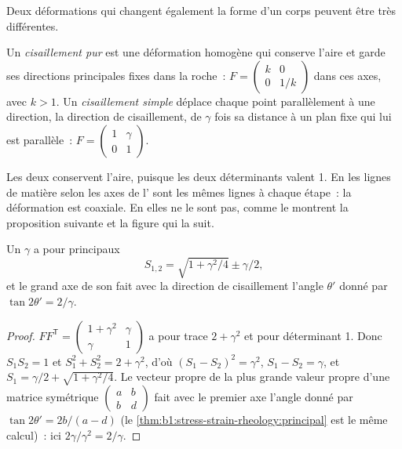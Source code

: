 Deux déformations qui changent également la forme d'un corps peuvent être très différentes.

\begin{definition}\label{def:b1:stress-strain-rheology:shear-types}
Un \emph{cisaillement pur} est une déformation homogène qui conserve
l'aire et garde ses directions principales fixes dans la roche~:
$F = \begin{pmatrix} k & 0 \\ 0 & 1/k\end{pmatrix}$ dans ces axes, avec
$k > 1$. Un \emph{cisaillement simple} déplace chaque point parallèlement à
une direction, la direction de cisaillement, de $\gamma$ fois sa distance à un
plan fixe qui lui est parallèle~:
$F = \begin{pmatrix} 1 & \gamma \\ 0 & 1\end{pmatrix}$.
\end{definition}

Les deux conservent l'aire, puisque les deux déterminants valent 1. En  les lignes de
matière selon les axes de l' sont les mêmes lignes à chaque
étape~: la déformation est coaxiale. En  elles ne le sont pas, comme le montrent la
proposition suivante et la figure qui la suit.

\begin{proposition}\label{prop:b1:stress-strain-rheology:simple-shear}
Un  $\gamma$ a pour  principaux
\[
  S_{1,2} = \sqrt{1 + \gamma^2/4} \pm \gamma/2 ,
\]
et le grand axe de son  fait avec la direction de cisaillement
l'angle $\theta'$ donné par $\tan2\theta' = 2/\gamma$.
\end{proposition}

\begin{proof}
$FF^{\mathsf T} = \begin{pmatrix} 1+\gamma^2 & \gamma \\ \gamma & 1\end{pmatrix}$
a pour trace $2+\gamma^2$ et pour déterminant 1. Donc $S_1S_2 = 1$ et
$S_1^2 + S_2^2 = 2 + \gamma^2$, d'où $(S_1 - S_2)^2 = \gamma^2$,
$S_1 - S_2 = \gamma$, et $S_1 = \gamma/2 + \sqrt{1+\gamma^2/4}$. Le
vecteur propre de la plus grande valeur propre d'une matrice symétrique
$\begin{pmatrix} a & b \\ b & d\end{pmatrix}$ fait avec le premier axe
l'angle donné par $\tan2\theta' = 2b/(a-d)$ (le \cref{thm:b1:stress-strain-rheology:principal}
est le même calcul)~: ici $2\gamma/\gamma^2 = 2/\gamma$.
\end{proof}


